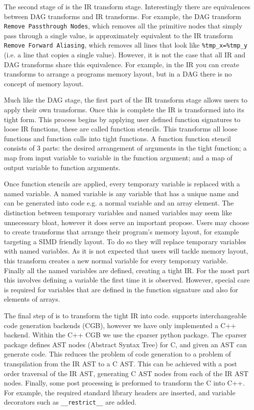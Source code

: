 The second stage of \phlat is the IR transform stage.
Interestingly there are equivalences between DAG transforms and IR transforms.
For example, the DAG transform \texttt{Remove Passthrough Nodes}, which removes all the primitive nodes that simply pass through a single value, is approximately equivalent to the IR transform \texttt{Remove Forward Aliasing}, which removes all lines that look like \lstinline{%tmp_x=%tmp_y} (i.e. a line that copies a single value).
However, it is not the case that all IR and DAG transforms share this equivalence.
For example, in the IR you can create transforms to arrange a programs memory layout, but in a DAG there is no concept of memory layout.

Much like the DAG stage, the first part of the IR transform stage allows users to apply their own transforms.
Once this is complete the IR is transformed into its tight form.
This process begins by applying user defined function signatures to loose IR functions, these are called function stencils.
This transforms all loose functions and function calls into tight functions.
A function function stencil consists of 3 parts: the desired arrangement of arguments in the tight function; a map from input variable to variable in the function argument; and a map of output variable to function arguments.

Once function stencils are applied, every temporary variable is replaced with a named variable.
A named variable is any variable that has a unique name and can be generated into code e.g. a normal variable and an array element.
The distinction between temporary variables and named variables may seem like unnecessary bloat, however it does serve an important propose.
Users may choose to create transforms that arrange their program's memory layout, for example targeting a SIMD friendly layout.
To do so they will replace temporary variables with named variables.
As it is not expected that users will tackle memory layout, this transform creates a new normal variable for every temporary variable. 
Finally all the named variables are defined, creating a tight IR.
For the most part this involves defining a variable the first time it is observed.
However, special care is required for variables that are defined in the function signature and also for elements of arrays.

The final step of \phlat is to transform the tight IR into code.
\phlat supports interchangeable code generation backends (CGB), however we have only implemented a C++ backend.
Within the C++ CGB we use the cparser python package.
The cparser package defines AST nodes (Abstract Syntax Tree) for C, and given an AST can generate code.
This reduces the problem of code generation to a problem of transpilation from the IR AST to a C AST.
This can be achieved with a post order traversal of the IR AST, generating C AST nodes from each of the IR AST nodes.
Finally, some post processing is preformed to transform the C into C++.
For example, the required standard library headers are inserted, and variable decorators such as \lstinline{__restrict__} are added.  

